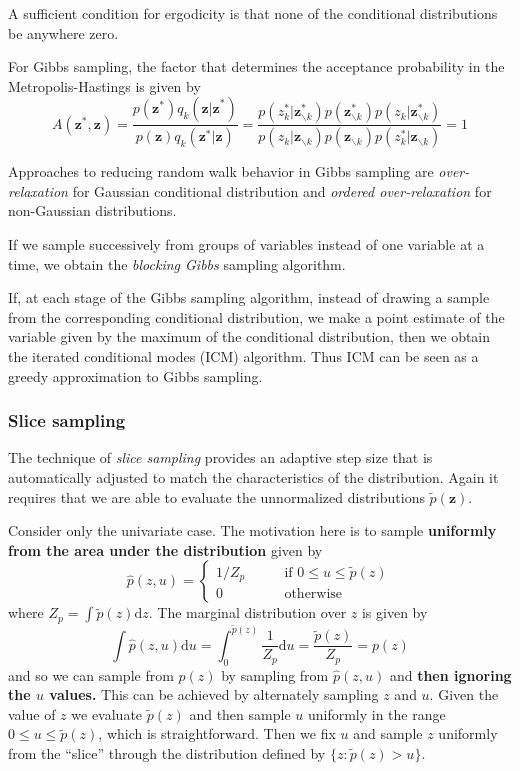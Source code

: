 \documentclass[a4paper]{book}
\newcommand{\ud}{\mathrm{d}}
\renewcommand{\bf}{\mathbf}
\newcommand{\imp}[1]{\textit{#1}}
\begin{document}
A sufficient condition for ergodicity is that none of the conditional distributions be anywhere zero.

For Gibbs sampling, the factor that determines the acceptance probability in the Metropolis-Hastings is given by
\begin{equation}
	A(\bf{z}^*,\bf{z})=\frac{p(\bf{z}^*)q_k(\bf{z|z}^*)}{p(\bf{z})q_k(\bf{z}^*|\bf{z})}=\frac{p(z_k^*|\bf{z}_{\backslash k}^*)p(\bf{z}_{\backslash k}^*)p(z_k|\bf{z}_{\backslash k}^*)}{p(z_k|\bf{z}_{\backslash k})p(\bf{z}_{\backslash k})p(z_k^*|\bf{z}_{\backslash k})} = 1
\end{equation}

Approaches to reducing random walk behavior in Gibbs sampling are \imp{over-relaxation} for Gaussian conditional distribution and \imp{ordered over-relaxation} for non-Gaussian distributions.

If we sample successively from groups of variables instead of one variable at a time, we obtain the \imp{blocking Gibbs} sampling algorithm.

If, at each stage of the Gibbs sampling algorithm, instead of drawing a sample from the corresponding conditional distribution, we make a point estimate of the variable given by the maximum of the conditional distribution, then we obtain the iterated conditional modes (ICM) algorithm. Thus ICM can be seen as a greedy approximation to Gibbs sampling.
\subsubsection{Slice sampling}
The technique of \imp{slice sampling} provides an adaptive step size that is automatically adjusted to match the characteristics of the distribution. Again it requires that we are able to evaluate the unnormalized distributions $\tilde{p}{(\bf{z})}$.

Consider only the univariate case. The motivation here is to sample \textbf{uniformly from the area under the distribution} given by
\begin{equation}
	\hat{p}(z,u) = \begin{cases}
		1/Z_p \qquad &\text{if $0 \leq u \leq \tilde{p}(z)$}\\
		0 \qquad &\text{otherwise}
	\end{cases}
\end{equation}
where $Z_p = \int \tilde{p}(z) \ud z$. The marginal distribution over $z$ is given by
\begin{equation}
	\int \hat{p}(z,u) \ud u = \int_{0}^{\tilde{p}(z)} \frac{1}{Z_p} \ud u = \frac{\tilde{p}(z)}{Z_p} = p(z)
\end{equation}
and so we can sample from $p(z)$ by sampling from $\hat{p}(z,u)$ and \textbf{then ignoring the $u$ values.} This can be achieved by alternately sampling $z$ and $u$. Given the value of $z$ we evaluate $\tilde{p}(z)$ and then sample $u$ uniformly in the range $0 \leq u \leq \tilde{p}(z)$, which is straightforward. Then we fix $u$ and sample $z$ uniformly from the ``slice'' through the distribution defined by $\{ z: \tilde{p}(z) > u \}$.
\end{document}
